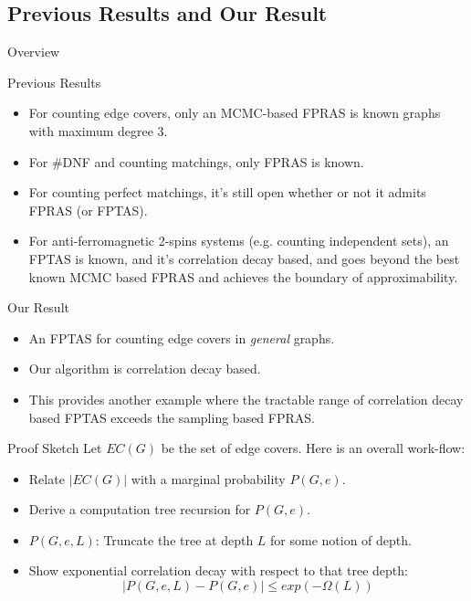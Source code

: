 \documentclass[mathserif]{beamer}
\newcommand{\abs}[1]{\left\vert#1\right\vert}
\begin{document}
\subsection{Previous Results and Our Result}
\begin{frame}{Overview}
	\tableofcontents[currentsubsection, hideothersubsections, sectionstyle=show/shaded, subsectionstyle=show/shaded]
\end{frame}
\begin{frame}{Previous Results}
	\begin{itemize}
		\item For counting edge covers, only an MCMC-based FPRAS is known graphs with maximum degree $3$.
			\pause
		\item For \#DNF and counting matchings, only FPRAS is known.
			\pause
		\item For counting perfect matchings, it's still open whether or not it admits FPRAS (or FPTAS).
			\pause
		\item For anti-ferromagnetic 2-spins systems (e.g. counting independent sets), an FPTAS is known, and it's correlation decay based, and goes beyond the best known MCMC based FPRAS and achieves the boundary of approximability.
	\end{itemize}

\end{frame}
\begin{frame}{Our Result}
	\begin{itemize}
		\item An FPTAS for counting edge covers in \emph{general} graphs.
		\item Our algorithm is correlation decay based.
		\item This provides another example where the tractable range of correlation decay based FPTAS exceeds the sampling based FPRAS.
	\end{itemize}

\end{frame}

\begin{frame}{Proof Sketch}
Let $EC(G)$ be the set of edge covers.
Here is an overall work-flow:
\begin{itemize}
  \item Relate $\abs{EC(G)}$ with a marginal probability $P(G,e)$.
  \item Derive a computation tree recursion for $P(G,e)$.
  \item $P(G,e,L)$: Truncate the tree at depth $L$ for some notion of depth.
  \item{ Show exponential correlation decay with respect to that tree depth:
  \[
    \abs{ P(G,e,L) - P(G,e) } \leq exp(-\Omega(L))
  \]}
\end{itemize}
\end{frame}
\end{document}
